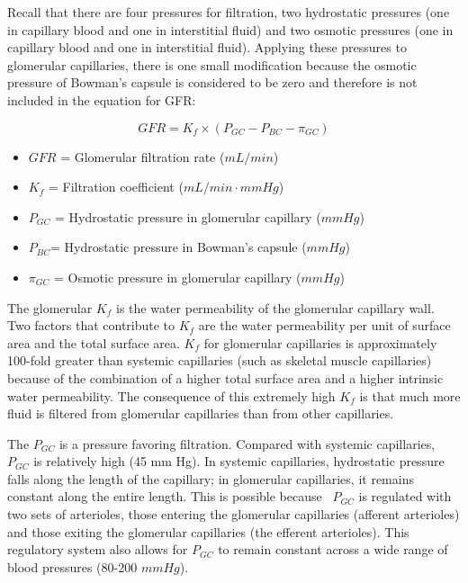 Recall that there are four pressures for filtration, two hydrostatic pressures (one in capillary blood and one in interstitial fluid) and two osmotic pressures (one in capillary blood and one in interstitial fluid). Applying these pressures to glomerular capillaries, there is one small modification because the osmotic pressure of Bowman’s capsule is considered to be zero and therefore is not included in the equation for GFR:

\begin{equation}
GFR = K_f \times (P_{GC} - P_{BC} - \pi_{GC})
\label{GFR}
\end{equation}

\begin{itemize}
\item $GFR$ = Glomerular filtration rate ($mL/min$) 
\item $K_f$ = Filtration coefficient ($mL/min \cdot mm Hg$) 
\item $P_{GC}$ = Hydrostatic pressure in glomerular capillary ($mm Hg$) 
\item $P_{BC} $= Hydrostatic pressure in Bowman’s capsule ($mm Hg$) 
\item $\pi_{GC}$ = Osmotic pressure in glomerular capillary ($mm Hg$) 
\end{itemize} 

The glomerular $K_f$  is the water permeability of the glomerular capillary wall. Two factors that contribute to $K_f$ are the water permeability per unit of surface area and the total surface area. $K_f$ for glomerular capillaries is approximately 100-fold greater than systemic capillaries (such as skeletal muscle capillaries) because of the combination of a higher total surface area and a higher intrinsic water permeability. The consequence of this extremely high $K_f$ is that much more fluid is filtered from glomerular capillaries than from other capillaries.

The $P_{GC}$  is a pressure favoring filtration.  Compared with systemic capillaries, $P_{GC}$ is relatively high (45 mm Hg). In systemic capillaries, hydrostatic pressure falls along the length of the capillary; in glomerular capillaries, it remains constant along the entire length. This is possible because  $P_{GC}$ is regulated with two sets of arterioles, those entering the glomerular capillaries (afferent arterioles) and those exiting the glomerular capillaries (the efferent arterioles). This regulatory system also allows for $P_{GC}$  to remain constant across a wide range of blood pressures (80-200 $mm Hg$).

